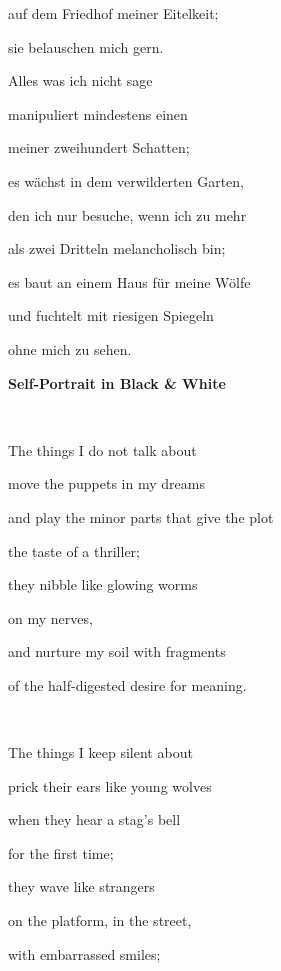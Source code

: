 \documentclass[a4paper]{article}
\begin{document}
auf dem Friedhof meiner Eitelkeit;

sie belauschen mich gern.


\bigskip

Alles was ich nicht sage

manipuliert mindestens einen

meiner zweihundert Schatten;

es wächst in dem verwilderten Garten,

den ich nur besuche, wenn ich zu mehr 

als zwei Dritteln melancholisch bin;

es baut an einem Haus für meine Wölfe \ 

und fuchtelt mit riesigen Spiegeln

ohne mich zu sehen.


\bigskip


\bigskip


\bigskip


\bigskip


\bigskip


\bigskip


\bigskip


\bigskip


\bigskip


\bigskip


\bigskip

{\bfseries
Self-Portrait in Black \& White}

~

The things I do not talk about

move the puppets in my dreams

and play the minor parts that give the plot 

the taste of a thriller;

they nibble like glowing worms

on my nerves,

and nurture my soil with fragments

of the half-digested desire for meaning.

~

The things I keep silent about

prick their ears like young wolves

when they hear a stag’s bell

for the first time;

they wave like strangers

on the platform, in the street,

with embarrassed smiles;
\end{document}

